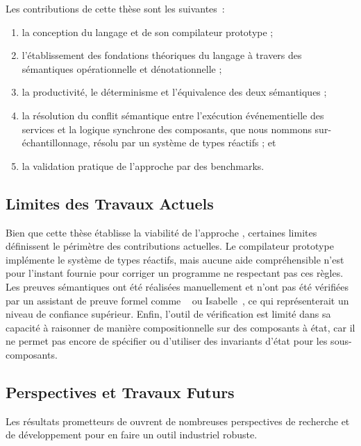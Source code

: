 Les contributions de cette thèse sont les suivantes~:
\begin{enumerate}
      \item la conception du langage \GRust et de son compilateur prototype ;

      \item l'établissement des fondations théoriques du langage à travers des sémantiques
            opérationnelle et dénotationnelle ;

      \item la productivité, le déterminisme et l'équivalence des deux sémantiques ;

      \item la résolution du conflit sémantique entre l'exécution événementielle des services et la
            logique synchrone des composants, que nous nommons sur-échantillonnage, résolu par un
            système de types réactifs ; et

      \item la validation pratique de l'approche par des benchmarks.
\end{enumerate}

\subsection{Limites des Travaux Actuels}

Bien que cette thèse établisse la viabilité de l'approche \GRust, certaines limites définissent le
périmètre des contributions actuelles. Le compilateur prototype implémente le système de types
réactifs, mais aucune aide compréhensible n'est pour l'instant fournie pour corriger un programme ne
respectant pas ces règles. Les preuves sémantiques ont été réalisées manuellement et n'ont pas
été vérifiées par un assistant de preuve formel comme \Rocq~\cite{rocq} ou
Isabelle~\cite{DBLP:books/sp/NipkowPW02}, ce qui représenterait un niveau de confiance supérieur.
Enfin, l'outil de vérification \GReusot est limité dans sa capacité à raisonner de manière
compositionnelle sur des composants à état, car il ne permet pas encore de spécifier ou d'utiliser
des invariants d'état pour les sous-composants.

\subsection{Perspectives et Travaux Futurs}

Les résultats prometteurs de \GRust ouvrent de nombreuses perspectives de recherche et de
développement pour en faire un outil industriel robuste.

